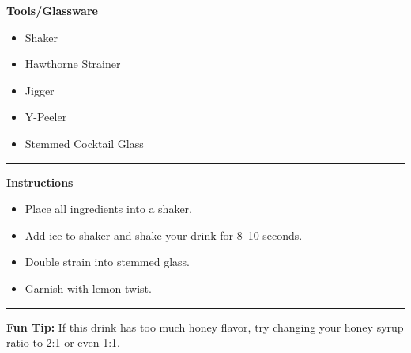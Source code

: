 \hspace{.01\textwidth}\vrule\hspace{.01\textwidth}
\begin{minipage}[t]{.49\textwidth}
    \noindent
    \textbf{\large Tools/Glassware}
    \begin{itemize}
        \item Shaker
        \item Hawthorne Strainer
        \item Jigger
        \item Y-Peeler
        \item Stemmed Cocktail Glass
    \end{itemize}
\end{minipage}
\vspace{.5em}\hrule\vspace{.5em}
\noindent
\begin{minipage}{\textwidth}
    \noindent
    \textbf{\large Instructions}
    \begin{itemize}
        \item Place all ingredients into a shaker.
        \item Add ice to shaker and shake your drink for 8--10 seconds.
        \item Double strain into stemmed glass.
        \item Garnish with lemon twist.
    \end{itemize}
\end{minipage}
\vspace{.5em}\hrule\vspace{.5em}
\noindent
\textbf{\large Fun Tip:} If this drink has too much honey flavor, try changing your honey syrup ratio to 2:1 or even 1:1.
\newpage
